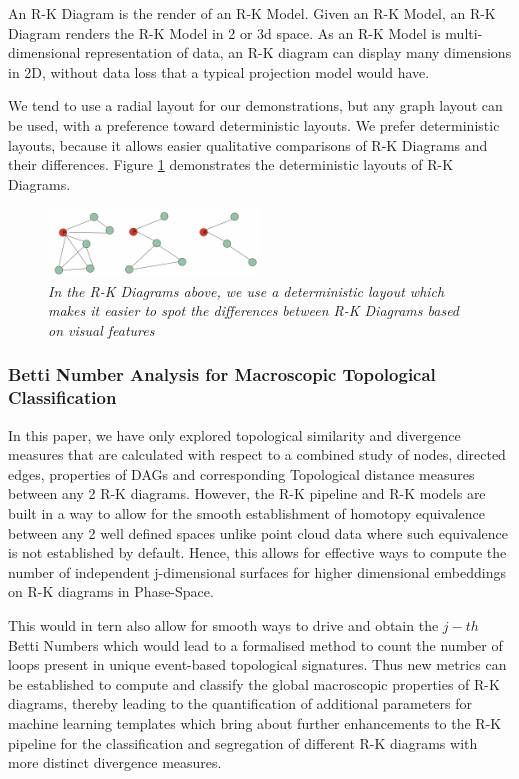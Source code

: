 An R-K Diagram is the render of an R-K Model. Given an R-K Model, an R-K Diagram renders the R-K Model in 2 or 3d space. As an R-K Model is multi-dimensional representation of data, an R-K diagram can display many dimensions in 2D, without data loss that a typical projection model would have.

We tend to use a radial layout for our demonstrations, but any graph layout can be used, with a preference toward deterministic layouts. We prefer deterministic layouts, because it allows easier qualitative comparisons of R-K Diagrams and their differences. Figure \ref{fig:layouts} demonstrates the deterministic layouts of R-K Diagrams. 

\begin{figure}[H]
	\centering
        \includegraphics[width=0.5\textwidth]{images/rk-diagram-layouts.png}
	\caption{\textit{In the R-K Diagrams above, we use a deterministic layout which makes it easier to spot the differences between R-K Diagrams based on visual features}}
	\label{fig:layouts}
\end{figure}

\subsubsection{Betti Number Analysis for Macroscopic Topological Classification}
\label{sec:BettiNumber}
In this paper, we have only explored topological similarity and divergence measures that are calculated with respect to a combined study of nodes, directed edges, properties of DAGs and corresponding Topological distance measures between any 2 R-K diagrams. However, the R-K pipeline and R-K models are built in a way to allow for the smooth establishment of homotopy equivalence between any 2 well defined spaces unlike point cloud data where such equivalence is not established by default. Hence, this allows for effective ways to compute the number of independent j-dimensional surfaces for higher dimensional embeddings on R-K diagrams in Phase-Space. 

This would in tern also allow for smooth ways to drive and obtain the $j-th$ Betti Numbers which would lead to a formalised method to count the number of loops present in unique event-based topological signatures. Thus new metrics can be established to compute and classify the global macroscopic properties of R-K diagrams, thereby leading to the quantification of additional parameters for machine learning templates which bring about further enhancements to the R-K pipeline for the classification and segregation of different R-K diagrams with more distinct divergence measures.
 
